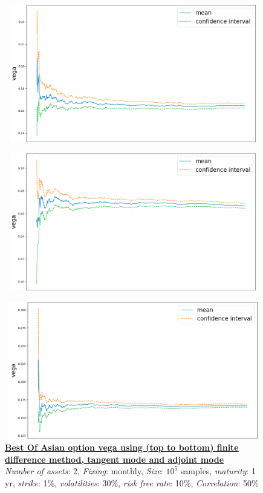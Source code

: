 \documentclass {article}
\begin{document}
			\begin{center}
				\begin{figure}[!h]
					\centering
				            \includegraphics[width=15cm, height=6cm]{bestOfAsianOptionFiniteDifferenceMethodVega.png}
				\end{figure}
			\end{center}
			
			
			\begin{center}
				\begin{figure}[!h]
					\centering
				            \includegraphics[width=15cm, height=6cm]{bestOfAsianOptionTangentModeVega.png}
				\end{figure}
			\end{center}

			\begin{center}
				\begin{figure}[!h]
					\centering
				            \includegraphics[width=15cm, height=6cm]{bestOfAsianOptionAdjointModeVega.png}
							\caption{\textbf{\underline{Best Of Asian option vega using (top to bottom) finite difference method, tangent mode and adjoint mode}} 
							\\ \textit{Number of assets}: 2, \textit{Fixing}: monthly, \textit{Size}: $10^{5}$ samples, \textit{maturity}: 1 yr, \textit{strike}: 1\%, \textit{volatilities}: 30\%, \textit{risk free rate}: 10\%, \textit{Correlation}: 50\%}
				\end{figure}
			\end{center}
\end{document}
